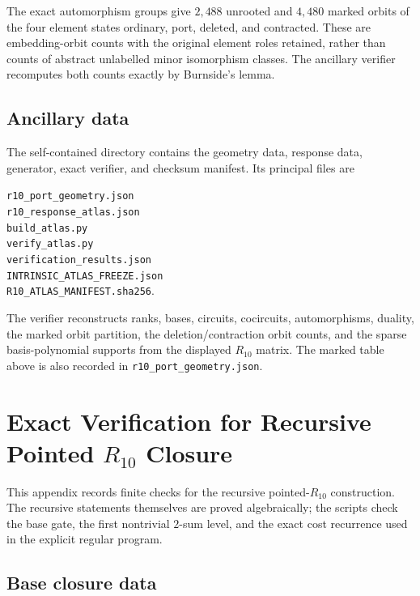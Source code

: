 \documentclass[11pt]{article}
\numberwithin{equation}{section}
\theoremstyle{remark}
\begin{document}
The exact automorphism groups give $2{,}488$ unrooted and $4{,}480$ marked
orbits of the four element states ordinary, port, deleted, and contracted.
These are embedding-orbit counts with the original element roles retained,
rather than counts of abstract unlabelled minor isomorphism classes. The
ancillary verifier recomputes both counts exactly by Burnside's lemma.

\subsection{Ancillary data}
\label{app:r10-atlas-ancillary}

The self-contained directory  contains the
geometry data, response data, generator, exact verifier, and checksum
manifest. Its principal files are
\begin{center}
\small
\texttt{r10\_port\_geometry.json}\\
\texttt{r10\_response\_atlas.json}\\
\texttt{build\_atlas.py}\\
\texttt{verify\_atlas.py}\\
\texttt{verification\_results.json}\\
\texttt{INTRINSIC\_ATLAS\_FREEZE.json}\\
\texttt{R10\_ATLAS\_MANIFEST.sha256}.
\end{center}
The verifier reconstructs ranks, bases, circuits, cocircuits, automorphisms,
duality, the marked orbit partition, the deletion/contraction orbit counts,
and the sparse basis-polynomial supports from the displayed $R_{10}$ matrix.
The marked table above is also recorded in
\texttt{r10\_port\_geometry.json}.

\section{Exact Verification for Recursive Pointed \texorpdfstring{$R_{10}$}{R10} Closure}
\label{app:r10-recursive-verification}

This appendix records finite checks for the recursive pointed-$R_{10}$
construction. The recursive statements themselves are proved algebraically;
the scripts check the base gate, the first nontrivial $2$-sum level, and the
exact cost recurrence used in the explicit regular program.

\subsection{Base closure data}
\label{app:r10-recursive-base}
\end{document}
